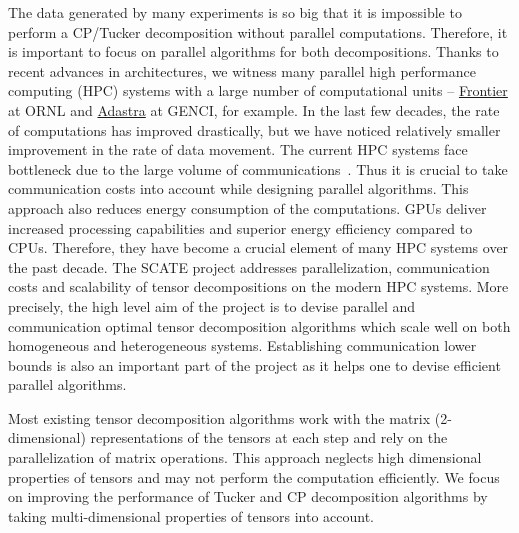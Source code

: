 \documentclass[a4paper,11pt]{article}
\begin{document}
	
	The data generated by many experiments is so big that it is impossible to perform a CP/Tucker decomposition without parallel computations. Therefore, it is important to focus on parallel algorithms for both decompositions. Thanks to recent advances in architectures, we witness many parallel high performance computing (HPC) systems with a large number of computational units
	-- \href{https://www.olcf.ornl.gov/frontier}{Frontier} at ORNL and \href{https://www.genci.fr/en/our-computers}{Adastra} at GENCI, for example. In the last few decades, the rate of computations has improved drastically, but we have noticed relatively smaller improvement in the rate of data movement. The current HPC systems face bottleneck due to the large volume of communications~\cite{DOE-Report-2014}. Thus it is crucial to take communication costs into account while designing parallel algorithms. This approach also reduces energy consumption of the computations. GPUs deliver increased processing capabilities and superior energy efficiency compared to CPUs. Therefore, they have become a crucial element of many HPC systems over the past decade. The SCATE project addresses parallelization, communication costs and scalability of tensor decompositions on the modern HPC systems. More precisely, the high level aim of the project is to devise parallel and communication optimal tensor decomposition algorithms which scale well on both homogeneous and heterogeneous systems. Establishing communication lower bounds is also an important part of the project as it helps one to devise efficient parallel algorithms.
	
	
	Most existing tensor decomposition algorithms work with the matrix (2-dimensional) representations of the tensors at each step and rely on the parallelization of matrix operations. This approach neglects high dimensional properties of tensors and may not perform the computation efficiently. We focus on improving the performance of Tucker and CP decomposition algorithms by taking multi-dimensional properties of tensors into account.
	
	
	
\end{document}
